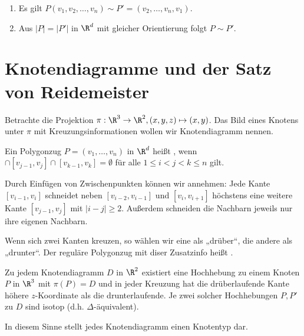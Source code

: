 \begin{nt}
    \begin{enumerate}[(1)]
        \item
            Es gilt $P(v_1, v_2, \dotsc, v_n) \sim P' = (v_2, \dotsc, v_n, v_1)$.
        \item
            Aus $|P| = |P'|$ in $\R^d$ mit gleicher Orientierung folgt $P \sim P'$.
    \end{enumerate}
\end{nt}


\section{Knotendiagramme und der Satz von Reidemeister}


Betrachte die Projektion $\pi: \R^3 \to \R^2, (x,y,z) \mapsto (x,y)$.
Das Bild eines Knotens unter $\pi$ mit Kreuzungsinformationen wollen wir Knotendiagramm nennen.

\begin{df}
    Ein Polygonzug $P = (v_1, \dotsc, v_n)$ in $\R^d$ heißt , wenn
    \begin{math}
        [v_{i-1},v_i] \cap [v_{j-1},v_j] \cap [v_{k-1}, v_{k}] = \emptyset
    \end{math}
    für alle $1 \le i < j < k \le n$ gilt.
\end{df}

\begin{note}
    Durch Einfügen von Zwischenpunkten können wir annehmen:
    Jede Kante $[v_{i-1}, v_i]$ schneidet neben $[v_{i-2}, v_{i-1}]$ und $[v_{i},v_{i+1}]$ höchstens eine weitere Kante $[v_{j-1},v_j]$ mit $|i-j| \ge 2$.
    Außerdem schneiden die Nachbarn jeweils nur ihre eigenen Nachbarn.

    Wenn sich zwei Kanten kreuzen, so wählen wir eine als „drüber“, die andere als „drunter“.
    Der reguläre Polygonzug mit diser Zusatzinfo heißt .
\end{note}

\begin{lem}
    Zu jedem Knotendiagramm $D$ in $\R^2$ existiert eine Hochhebung zu einem Knoten $P$ in $\R^3$ mit $\pi(P) = D$ und in jeder Kreuzung hat die drüberlaufende Kante höhere $z$-Koordinate als die drunterlaufende.
    Je zwei solcher Hochhebungen $P, P'$ zu $D$ sind isotop (d.h. $\Delta$-äquivalent).
\end{lem}

In diesem Sinne stellt jedes Knotendiagramm einen Knotentyp dar.


